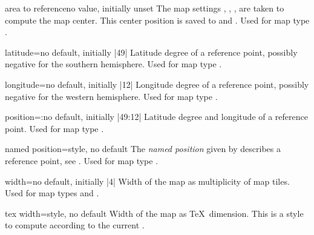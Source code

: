 \begin{docMrcKey}[supply]{area to reference}{}{no value, initially unset}
  The map settings
  , ,
  , 
  are taken to compute the map center. This center position is saved
  to  and .
  Used for map type .
\end{docMrcKey}



\begin{docMrcKey}[supply]{latitude}{=}{no default, initially |49|}
  Latitude degree of a reference point, possibly negative for the southern hemisphere.
  Used for map type .
\end{docMrcKey}

\begin{docMrcKey}[supply]{longitude}{=}{no default, initially |12|}
  Longitude degree of a reference point, possibly negative for the western hemisphere.
  Used for map type .
\end{docMrcKey}


\begin{docMrcKey}[supply]{position}{=:}{no default, initially |49:12|}
  Latitude degree and longitude of a reference point.
  Used for map type .
\end{docMrcKey}


\begin{docMrcKey}[supply]{named position}{=}{style, no default}
  The \emph{named position} given by  describes
  a reference point, see .
  Used for map type .
\end{docMrcKey}


\pagebreak
\begin{docMrcKey}[supply]{width}{=}{no default, initially |4|}
  Width of the map as multiplicity of map tiles.
  Used for map types  and .
\end{docMrcKey}

\begin{docMrcKey}[supply]{tex width}{=}{style, no default}
  Width of the map as \TeX\ dimension.
  This is a style to compute  according to
  the current .
\end{docMrcKey}

